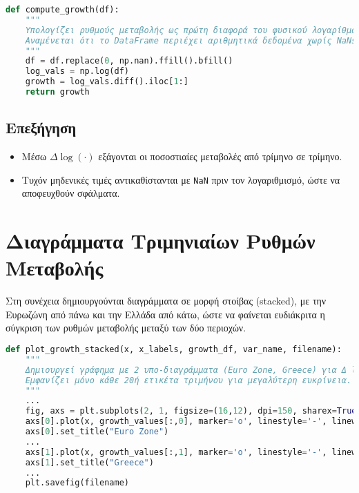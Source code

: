 \documentclass{book}
\begin{document}
\begin{tcolorbox}[colback=white,colframe=black,title=Απόσπασμα Κώδικα: Ρυθμοί Μεταβολής]
\begin{lstlisting}[language=Python]
def compute_growth(df):
    """
    Υπολογίζει ρυθμούς μεταβολής ως πρώτη διαφορά του φυσικού λογαρίθμου.
    Αναμένεται ότι το DataFrame περιέχει αριθμητικά δεδομένα χωρίς NaNs.
    """
    df = df.replace(0, np.nan).ffill().bfill()
    log_vals = np.log(df)
    growth = log_vals.diff().iloc[1:]
    return growth
\end{lstlisting}
\end{tcolorbox}

\subsection*{Επεξήγηση}
\begin{itemize}
  \item Μέσω \(\Delta \log(\cdot)\) εξάγονται οι ποσοστιαίες μεταβολές από τρίμηνο σε τρίμηνο.
  \item Τυχόν μηδενικές τιμές αντικαθίστανται με \texttt{NaN} πριν τον λογαριθμισμό, ώστε να αποφευχθούν σφάλματα.
\end{itemize}

\section{Διαγράμματα Τριμηνιαίων Ρυθμών Μεταβολής}
Στη συνέχεια δημιουργούνται διαγράμματα σε μορφή στοίβας (stacked), με την Ευρωζώνη από πάνω και την Ελλάδα από κάτω, ώστε να φαίνεται ευδιάκριτα η σύγκριση των ρυθμών μεταβολής μεταξύ των δύο περιοχών.

\begin{tcolorbox}[colback=white,colframe=black,title=Απόσπασμα Κώδικα: Σχεδιασμός Τριμηνιαίων Ρυθμών Μεταβολής]
\begin{lstlisting}[language=Python]
def plot_growth_stacked(x, x_labels, growth_df, var_name, filename):
    """
    Δημιουργεί γράφημα με 2 υπο-διαγράμματα (Euro Zone, Greece) για Δ log(series).
    Εμφανίζει μόνο κάθε 20ή ετικέτα τριμήνου για μεγαλύτερη ευκρίνεια.
    """
    ...
    fig, axs = plt.subplots(2, 1, figsize=(16,12), dpi=150, sharex=True)
    axs[0].plot(x, growth_values[:,0], marker='o', linestyle='-', linewidth=2, color='tab:blue')
    axs[0].set_title("Euro Zone")
    ...
    axs[1].plot(x, growth_values[:,1], marker='o', linestyle='-', linewidth=2, color='tab:orange')
    axs[1].set_title("Greece")
    ...
    plt.savefig(filename)
\end{lstlisting}
\end{tcolorbox}
\end{document}
